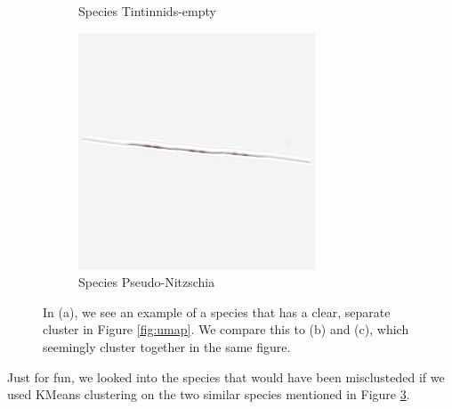 \begin{figure}[H]
\begin{subfigure}[b]{0.32\linewidth}
        \caption{Species Tintinnids-empty}
        \label{fig:empty}
    \end{subfigure}
    \begin{subfigure}[b]{0.32\linewidth}
        \centering
        \includegraphics[width=\linewidth]{examples/tests_eb/figs/plankton_examplebatch/pseudo.png}
        \caption{Species Pseudo-Nitzschia}
        \label{fig:pseudo}
    \end{subfigure}
    \caption{In (a), we see an example of a species that has a clear, separate cluster in Figure \ref{fig:umap}. We compare this to (b) and (c), which seemingly cluster together in the same figure.}
    \label{fig:grid}
\end{figure}

Just for fun, we looked into the species that would have been misclusteded if we used KMeans clustering on the two similar species mentioned in Figure \ref{fig:grid}. 

